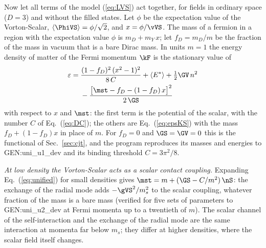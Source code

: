 Now let all terms of the model (\ref{eq:LVS}) act together, for fields in ordinary space ($D=3$) and
without the filled states. Let $\phi$ be the expectation value of the Vorton-Scalar,
$\langle\PhiVS\rangle=\phi/\sqrt2$, and $x=\phi/\vVS$. The mass of a fermion in a region with the
expectation value $\phi$ is $m_D+m_Y\,x$; let $f_D=m_D/m$ be the fraction of the mass in vacuum that
is a bare Dirac mass. In units $m=1$ the energy density of matter of the Fermi momentum $\kF$ is the
stationary value of
\begin{equation}
\begin{aligned}
\varepsilon={}&\frac{(1-f_D)^{2}\,(x^{2}-1)^{2}}{8\,C}+\langle E^{*}\rangle+\tfrac12\GV\,n^{2}\\
&-\frac{\big[\mst-f_D-(1-f_D)\,x\big]^{2}}{2\,\GS}
\end{aligned}
\label{eq:unified}
\end{equation}
with respect to $x$ and $\mst$: the first term is the potential of the scalar, with the number $C$
of Eq.~(\ref{eq:DC}); the others are Eq.~(\ref{eq:epsKS}) with the mass $f_D+(1-f_D)x$ in place of
$m$. For $f_D=0$ and $\GS=\GV=0$ this is the functional of Sec.~\ref{sec:cjt}, and the program
reproduces its masses and energies to {{GEN:uni_u1_dev}} and its binding threshold
$C=3\pi^{2}/8$.

\emph{At low density the Vorton-Scalar acts as a scalar contact coupling.} Expanding
Eq.~(\ref{eq:unified}) for small densities gives $\mst=m+(\GS-C/m^{2})\,\nS$: the exchange of the
radial mode adds $-\gVS^{2}/m_s^{2}$ to the scalar coupling, whatever fraction of the mass is a bare
mass (verified for five sets of parameters to {{GEN:uni_u2_dev}} at Fermi momenta up to a
twentieth of $m$). The scalar
channel of the self-interaction and the exchange of the radial mode are the same interaction at
momenta far below $m_s$; they differ at higher densities, where the scalar field itself changes.

